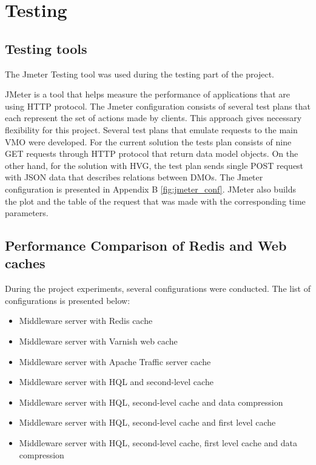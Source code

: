 \section{Testing}

\subsection{Testing tools}

The Jmeter Testing tool was used during the testing part of the project. 

JMeter is a tool that helps measure the performance of applications that are using HTTP protocol. The Jmeter configuration consists of several test plans that each represent the set of actions made by clients. This approach gives necessary flexibility for this project. Several test plans that emulate requests to the main VMO were developed. For the current solution the tests plan consists of nine GET requests through HTTP protocol that return data model objects. On the other hand, for the solution with HVG, the test plan sends single POST request with JSON data that describes relations between DMOs. The Jmeter configuration is presented in Appendix B \ref{fig:jmeter_conf}. JMeter also builds the plot and the table of the request that was made with the corresponding time parameters.

\subsection{Performance Comparison of Redis and Web caches}


During the project experiments, several configurations were conducted. The list of configurations is presented below:

\begin{itemize}
  \item Middleware server with Redis cache
  \item Middleware server with Varnish web cache
  \item Middleware server with Apache Traffic server cache
  \item Middleware server with HQL and second-level cache
  \item Middleware server with HQL, second-level cache and data compression
  \item Middleware server with HQL, second-level cache and first level cache
  \item Middleware server with HQL, second-level cache, first level cache and data compression
\end{itemize}


